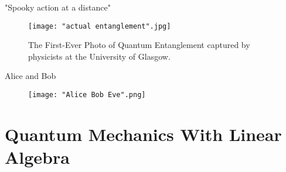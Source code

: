 \documentclass[handout, 10 pt]{beamer}
\newcommand{\icol}[1]{%
  \left(\begin{smallmatrix}#1\end{smallmatrix}\right)%
}
\begin{document}
\begin{comment}
Another shocking thing about quantum mechanics is such phenomenon described by Albert Einstein as the "spooky action at a distance". What's so spooky about it is that one event in the universe can instantaneously affect another event arbitrarily far away, which seems to imply faster than light communication. We now refer to as entanglement and will go over it in more detail later. 
\end{comment}
\begin{frame}{"Spooky action at a distance"}
\begin{figure}[h]
    \centering
    \texttt{[image: "actual entanglement".jpg]}
    \caption{The First-Ever Photo of Quantum Entanglement captured by physicists at the University of Glasgow.}
    \label{fig:actual entanglement}
\end{figure}
\end{frame}

\begin{comment}
In cryptography, Alice and Bob try to communicate securely under the prying eyes of Eve. In my thesis, I investigate to apply quantum mechanics phenomenon such as entanglement to enhance security in cryptography.
emphasize it's a collaborative game between Alice and Bob against Eve
\end{comment}

\begin{frame}{Alice and Bob}
\begin{figure}[h]
    \centering
    \texttt{[image: "Alice Bob Eve".png]}
    \label{fig:Alice Bob Eve}
\end{figure}    
\end{frame}

\section{Quantum Mechanics With Linear Algebra}

\begin{comment}
Mathematically, a {\emph{qubit}} is a unit vector in a two-dimensional complex vector space.  In the same way that the bit is the fundamental unit of classical computation and information, the quantum bit, or qubit is the basic unit of quantum information.  With this motivation in mind, we sometimes write $\ket{0} = \icol{1\\0}$, and $\ket{1} = \icol{0\\1}$. Note that the symbols "$\ket{0}$" and "$\ket{1}$" are read "ket one" and "ket two".\footnote{We are using so-called Bra-ket notation common in quantum mechanics}  While bits may only take the values $0$ or $1$, a qubit is a complex linear combination, or \textit{superposition} of $\ket{0}$ and $\ket{1}$ with norm equal to one. 
\end{comment}
\end{document}
